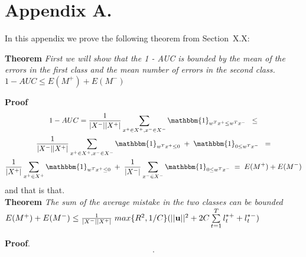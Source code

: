 \documentclass[twoside,11pt]{article}
\begin{document}

\newpage

\appendix
\section*{Appendix A.}
\label{app:theorem}



In this appendix we prove the following theorem from
Section~X.X:

\noindent

{\bf Theorem} {\it First we will show that the 1 - AUC is bounded by the mean 
of the errors in the first class and the mean number of errors in the second
class.  $1 - AUC \leq E(M^+) + E(M^-)$ 
} \hfill\BlackBox

{\bf Proof} 
\begin{multline}
1 - AUC = \frac{1}{|X^-| |X^+|} \sum\limits_{x^+ \in X^+, x^- \in X^-}{  \mathbbm{1}_{w^T x^+ \leq w^T x^-} } \;\;\leq \\
\frac{1}{|X^-| |X^+|}  \sum\limits_{x^+ \in X^+, x^- \in X^-}{  \mathbbm{1}_{w^T x^+ \leq 0} \;+\; \mathbbm{1}_{0 \leq w^T x^-}  }  \;\;= \\
\frac{1}{|X^+|}  \sum\limits_{x^+ \in X^+}{  \mathbbm{1}_{w^T x^+ \leq 0} } \;+\; \frac{1}{|X^-|}  \sum\limits_{x^- \in X^-}{\mathbbm{1}_{0 \leq w^T x^-}  }   \;= \;
E(M^+) + E(M^-)
\end{multline}
and that is that.\\


{\bf Theorem} {\it The sum of the average mistake in the two classes can be bounded \\
$E(M^+) + E(M^-) \leq 
\frac{1}{|X^-| |X^+|} \; max\{R^2, 1/C\}( ||{\bf u}||^2 + 2C \sum\limits_{t=1}^T{ l_t^{*+} + l_t^{*-}} ) $
} \hfill\BlackBox

{\bf Proof}.
\begin{multline}
.
\end{multline}


\vskip 0.2in

\end{document}
